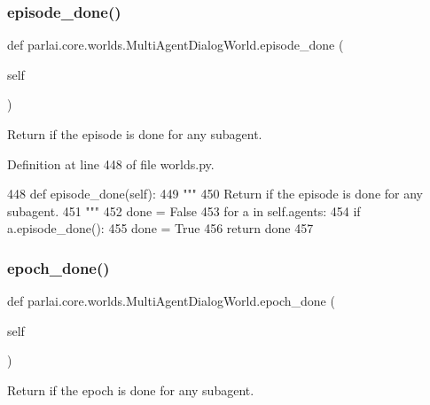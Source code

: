 \subsubsection{\texorpdfstring{episode\+\_\+done()}{episode\_done()}}
{\footnotesize\ttfamily def parlai.\+core.\+worlds.\+Multi\+Agent\+Dialog\+World.\+episode\+\_\+done (\begin{DoxyParamCaption}\item[{}]{self }\end{DoxyParamCaption})}

\begin{DoxyVerb}Return if the episode is done for any subagent.
\end{DoxyVerb}
 

Definition at line 448 of file worlds.\+py.


\begin{DoxyCode}
448     \textcolor{keyword}{def }episode\_done(self):
449         \textcolor{stringliteral}{"""}
450 \textcolor{stringliteral}{        Return if the episode is done for any subagent.}
451 \textcolor{stringliteral}{        """}
452         done = \textcolor{keyword}{False}
453         \textcolor{keywordflow}{for} a \textcolor{keywordflow}{in} self.agents:
454             \textcolor{keywordflow}{if} a.episode\_done():
455                 done = \textcolor{keyword}{True}
456         \textcolor{keywordflow}{return} done
457 
\end{DoxyCode}
\mbox{\label{classparlai_1_1core_1_1worlds_1_1MultiAgentDialogWorld_ade057311db0368be26ac8b196619b862}} 
\subsubsection{\texorpdfstring{epoch\+\_\+done()}{epoch\_done()}}
{\footnotesize\ttfamily def parlai.\+core.\+worlds.\+Multi\+Agent\+Dialog\+World.\+epoch\+\_\+done (\begin{DoxyParamCaption}\item[{}]{self }\end{DoxyParamCaption})}

\begin{DoxyVerb}Return if the epoch is done for any subagent.
\end{DoxyVerb}
 

